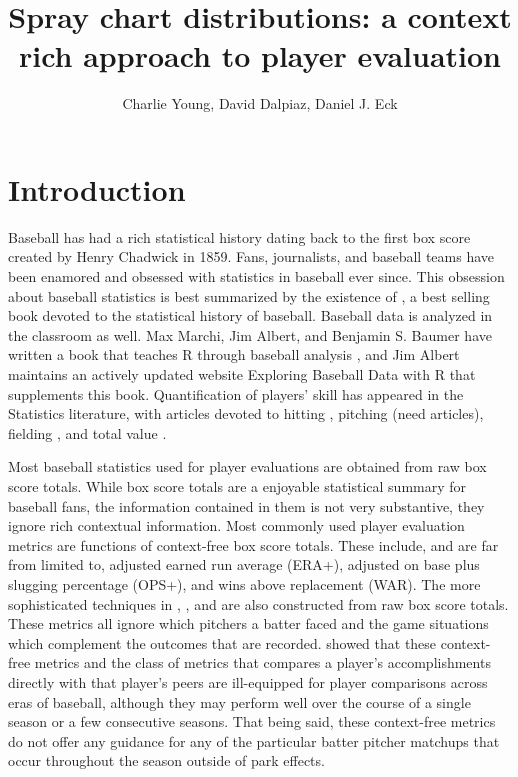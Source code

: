 \documentclass[11pt]{article}
\title{Spray chart distributions: a context rich approach to player evaluation}
\author{Charlie Young, David Dalpiaz, Daniel J. Eck}
\begin{document}
\maketitle

\begin{abstract}

\end{abstract}



\section{Introduction}

Baseball has had a rich statistical history dating back to the first box score created by Henry Chadwick in 1859. Fans, journalists, and baseball teams have been enamored and obsessed with statistics in baseball ever since. This obsession about baseball statistics is best summarized by the existence of \cite{schwarz2004numbers}, a best selling book devoted to the statistical history of baseball. Baseball data is analyzed in the classroom as well. Max Marchi, Jim Albert, and Benjamin S. Baumer have written a book that teaches R through baseball analysis \citep{marchi2019analyzing}, and Jim Albert maintains an actively updated website Exploring Baseball Data with R that supplements this book. 
Quantification of players' skill has appeared in the Statistics literature, with articles devoted to
hitting \citep{berry1999bridging, albert2008streaky, jensen2009hierarchical},
pitching (need articles),
fielding \citep{jensen2009bayesball, piette2012estimating}, 
and total value \citep{baumer2015openwar}.


Most baseball statistics used for player evaluations are obtained from raw box score totals. While box score totals are a enjoyable statistical summary for baseball fans, the information contained in them is not very substantive, they ignore rich contextual information. Most commonly used player evaluation metrics are functions of context-free box score totals. These include, and are far from limited to, adjusted earned run average (ERA+), adjusted on base plus slugging percentage (OPS+), and wins above replacement (WAR). The more sophisticated techniques in \citet{berry1999bridging}, \cite{jensen2009hierarchical}, and \cite{baumer2015openwar} are also constructed from raw box score totals. These metrics all ignore which pitchers a batter faced and the game situations which complement the outcomes that are recorded. \cite{eck2020challenging} showed that these context-free metrics and the class of metrics that compares a player's accomplishments directly with that player's peers are ill-equipped for player comparisons across eras of baseball, although they may perform well over the course of a single season or a few consecutive seasons. That being said, these context-free metrics do not offer any guidance for any of the particular batter pitcher matchups that occur throughout the season outside of park effects.
\end{document}
